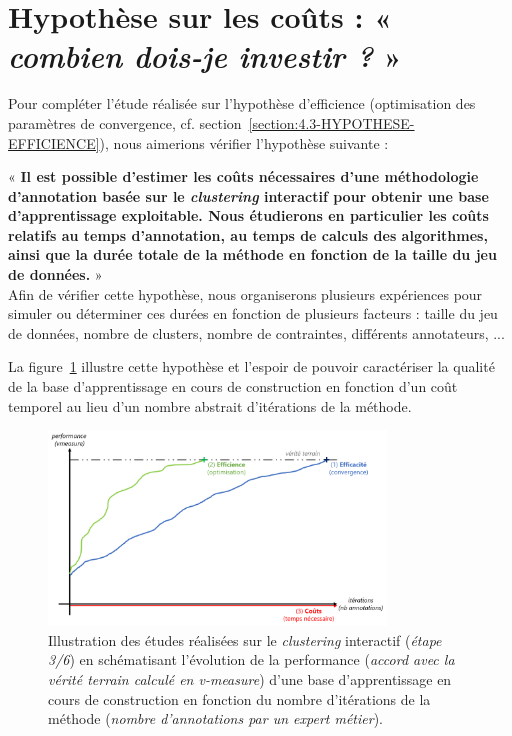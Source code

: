 \section{Hypothèse sur les coûts : « \textit{combien dois-je investir ?} »}
\label{section:4.3-HYPOTHESE-COUTS}

	Pour compléter l'étude réalisée sur l'hypothèse d'efficience (optimisation des paramètres de convergence, cf. section~\ref{section:4.3-HYPOTHESE-EFFICIENCE}), nous aimerions vérifier l'hypothèse suivante :

	\begin{tcolorbox}[
		title=\faVial~\textbf{Hypothèse sur les coûts}~\faVial,
		colback=colorTcolorboxHypothesis!15,
		colframe=colorTcolorboxHypothesis!75,
		width=\linewidth
	]
		«\textbf{
			Il est possible d'\textbf{estimer les coûts nécessaires} d'une méthodologie d'annotation basée sur le \textit{clustering} interactif pour obtenir une base d'apprentissage exploitable. Nous étudierons en particulier les coûts relatifs au temps d'annotation, au temps de calculs des algorithmes, ainsi que la durée totale de la méthode en fonction de la taille du jeu de données.
		} » \\

		Afin de vérifier cette hypothèse, nous organiserons plusieurs expériences pour simuler ou déterminer ces durées en fonction de plusieurs facteurs : taille du jeu de données, nombre de clusters, nombre de contraintes, différents annotateurs, ...
		
		La figure~\ref{figure:4.3-HYPOTHESE-COUTS} illustre cette hypothèse et l'espoir de pouvoir caractériser la qualité de la base d'apprentissage en cours de construction en fonction d'un coût temporel au lieu d'un nombre abstrait d'itérations de la méthode. 
		
		\begin{figure}[H]
			\centering
			\includegraphics[width=0.8\textwidth]{figures/hypotheses-03-couts}
			\caption{Illustration des études réalisées sur le \textit{clustering} interactif (\textit{étape 3/6}) en schématisant l'évolution de la performance (\textit{accord avec la vérité terrain calculé en v-measure}) d'une base d'apprentissage en cours de construction en fonction du nombre d'itérations de la méthode (\textit{nombre d'annotations par un expert métier}).}
			\label{figure:4.3-HYPOTHESE-COUTS}
		\end{figure}

	\end{tcolorbox}
	

